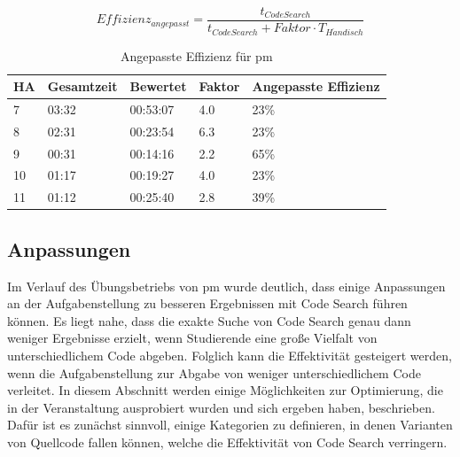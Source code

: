 \begin{equation}\label{eqn:adapted-efficiency}
    Effizienz_{angepasst} = \frac{t_{Code Search}}{t_{Code Search} + Faktor \cdot T_{H\ddot{a}ndisch}}
\end{equation}

\begin{table}
    \centering
    \caption{Angepasste Effizienz für \ac{pm}}
    \begin{tabular}{|l|l|l|l|l|}
    \hline
        HA & Gesamtzeit  & Bewertet  & Faktor  & Angepasste Effizienz  \\ \hline
        7 & 03:32  & 00:53:07  & 4.0  & 23\%  \\ \hline
        8 & 02:31  & 00:23:54  & 6.3  & 23\%  \\ \hline
        9 & 00:31  & 00:14:16  & 2.2  & 65\%  \\ \hline
        10 & 01:17  & 00:19:27  & 4.0  & 23\%  \\ \hline
        11 & 01:12 & 00:25:40 & 2.8 & 39\% \\ \hline
    \end{tabular}
    \label{tbl:pm-adapted-efficiency}
\end{table}

\subsection{Anpassungen}\label{subsec:pm-adaptations}

Im Verlauf des Übungsbetriebs von \ac{pm} wurde deutlich, dass einige Anpassungen an der Aufgabenstellung zu besseren Ergebnissen mit Code Search führen können.
Es liegt nahe, dass die exakte Suche von Code Search genau dann weniger Ergebnisse erzielt, wenn Studierende eine große Vielfalt von unterschiedlichem Code abgeben.
Folglich kann die Effektivität gesteigert werden, wenn die Aufgabenstellung zur Abgabe von weniger unterschiedlichem Code verleitet.
In diesem Abschnitt werden einige Möglichkeiten zur Optimierung, die in der Veranstaltung ausprobiert wurden und sich ergeben haben, beschrieben.
Dafür ist es zunächst sinnvoll, einige Kategorien zu definieren, in denen Varianten von Quellcode fallen können, welche die Effektivität von Code Search verringern.

